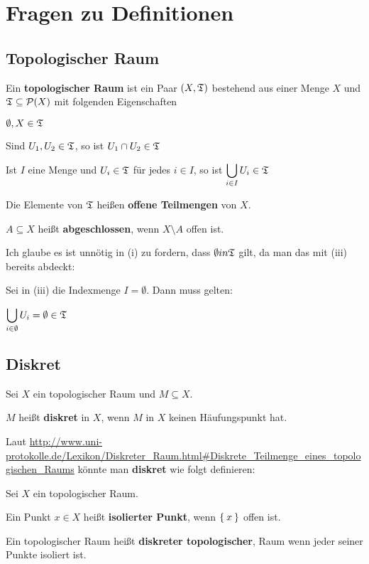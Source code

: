 \documentclass[a5paper,oneside]{scrbook}
\begin{document}
\chapter{Fragen zu Definitionen}
\section{Topologischer Raum}
\begin{definition}%
    Ein \textbf{topologischer Raum} ist ein Paar $(X, \mathfrak{T})$ bestehend
    aus einer Menge $X$ und $\mathfrak{T} \subseteq \mathcal{P}(X)$ mit
    folgenden Eigenschaften
    \begin{defenumprops}
        \item $\emptyset, X \in \mathfrak{T}$
        \item \label{def:topologie.ii} Sind $U_1, U_2 \in \mathfrak{T}$, so ist $U_1 \cap U_2 \in \mathfrak{T}$
        \item Ist $I$ eine Menge und $U_i \in \mathfrak{T}$ für jedes $i \in I$,
              so ist $\displaystyle \bigcup_{i \in I} U_i \in \mathfrak{T}$
    \end{defenumprops}
    Die Elemente von $\mathfrak{T}$ heißen \textbf{offene Teilmengen} von $X$. 

    $A \subseteq X$ heißt \textbf{abgeschlossen}, wenn $X \setminus A$ offen ist.
\end{definition}

Ich glaube es ist unnötig in (i) zu fordern, dass $\emptyset in \mathfrak{T}$ gilt,
da man das mit (iii) bereits abdeckt:

Sei in (iii) die Indexmenge $I = \emptyset$. Dann muss gelten:

$\displaystyle \bigcup_{i \in \emptyset} U_i = \emptyset \in \mathfrak{T}$

\section{Diskret}
\begin{definition}
    Sei $X$ ein topologischer Raum und $M \subseteq X$.

    $M$ heißt \textbf{diskret} in $X$, wenn $M$ in $X$ keinen 
    Häufungspunkt hat.
\end{definition}

Laut \url{http://www.uni-protokolle.de/Lexikon/Diskreter_Raum.html#Diskrete_Teilmenge_eines_topologischen_Raums}
könnte man \textbf{diskret} wie folgt definieren:

\begin{definition}
    Sei $X$ ein topologischer Raum.
    \begin{defenum}
        \item Ein Punkt $x \in X$ heißt \textbf{isolierter Punkt}, wenn $\Set{ x }$ offen ist.
        \item Ein topologischer Raum heißt \textbf{diskreter topologischer}, Raum wenn jeder seiner Punkte isoliert ist.
    \end{defenum}
\end{definition}
\end{document}
